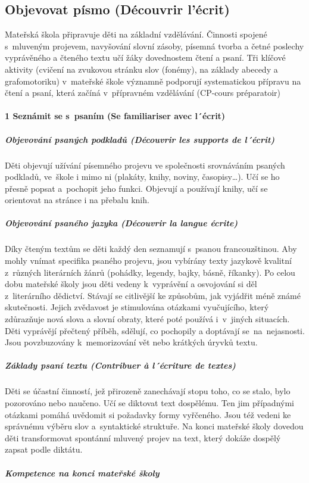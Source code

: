 		\subsection{Objevovat písmo (Découvrir l'écrit)}
			Mateřská škola připravuje děti na základní vzdělávání. Činnosti spojené s mluveným projevem, navyšování slovní zásoby, písemná tvorba a četné poslechy vyprávěného a čteného textu učí žáky dovednostem čtení a psaní. Tři klíčové aktivity (cvičení na zvukovou stránku slov (fonémy), na základy abecedy a grafomotoriku) v mateřské škole významně podporují systematickou přípravu na čtení a psaní, která začíná v přípravném vzdělávání (CP-cours préparatoir)

			\paragraph*{1 Seznámit se s psaním (Se familiariser avec l´écrit)}
				\subparagraph{Objevování psaných podkladů (Découvrir les supports de l´écrit)}
					Děti objevují užívání písemného projevu ve společnosti srovnáváním psaných podkladů, ve škole i mimo ni (plakáty, knihy, noviny, časopisy…). Učí se ho přesně popsat a pochopit jeho funkci. Objevují a používají knihy, učí se orientovat na stránce i na přebalu knih. 
				\subparagraph{Objevování psaného jazyka (Découvrir la langue écrite)}
					Díky čteným textům se děti každý den seznamují s psanou francouzštinou. Aby mohly vnímat specifika psaného projevu, jsou vybírány texty jazykově kvalitní z různých literárních žánrů (pohádky, legendy, bajky, básně, říkanky). Po celou dobu mateřské školy jsou děti vedeny k vyprávění a osvojování si děl z literárního dědictví. Stávají se citlivější ke způsobům, jak vyjádřit méně známé skutečnosti. Jejich zvědavost je stimulována otázkami vyučujícího, který zdůrazňuje nová slova a slovní obraty, které poté používá i v jiných situacích.  Děti vyprávějí přečtený příběh, sdělují, co pochopily a doptávají se na nejasnosti. Jsou povzbuzovány k memorizování vět nebo krátkých úryvků textu. 
				\subparagraph{Základy psaní textu (Contribuer à l´écriture de textes)}
					Děti se účastní činností, jež přirozeně zanechávají stopu toho, co se stalo, bylo pozorováno nebo naučeno. Učí se diktovat text dospělému. Ten jim případnými otázkami pomáhá uvědomit si požadavky formy vyřčeného. Jsou též vedeni ke správnému výběru slov a syntaktické struktuře. Na konci mateřské školy dovedou děti transformovat spontánní mluvený projev na text, který dokáže dospělý zapsat podle diktátu.
				\subparagraph{Kompetence na konci mateřské školy \hspace{3cm}}
